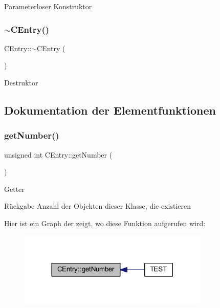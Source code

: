 Parameterloser Konstruktor \mbox{\label{class_c_entry_adb596f3be932c1db3d6072a9d6d26f5e}} 
\subsubsection{\texorpdfstring{$\sim$\+C\+Entry()}{~CEntry()}}
{\footnotesize\ttfamily C\+Entry\+::$\sim$\+C\+Entry (\begin{DoxyParamCaption}{ }\end{DoxyParamCaption})\hspace{0.3cm}{\ttfamily [virtual]}}

Destruktor 

\subsection{Dokumentation der Elementfunktionen}
\mbox{\label{class_c_entry_a6e8cde8d4a78cc65fceeb5f0430a2b55}} 
\subsubsection{\texorpdfstring{get\+Number()}{getNumber()}}
{\footnotesize\ttfamily unsigned int C\+Entry\+::get\+Number (\begin{DoxyParamCaption}{ }\end{DoxyParamCaption})\hspace{0.3cm}{\ttfamily [static]}}

Getter \begin{DoxyReturn}{Rückgabe}
Anzahl der Objekten dieser Klasse, die existieren 
\end{DoxyReturn}
Hier ist ein Graph der zeigt, wo diese Funktion aufgerufen wird\+:
\nopagebreak
\begin{figure}[H]
\begin{center}
\leavevmode
\includegraphics[width=257pt]{class_c_entry_a6e8cde8d4a78cc65fceeb5f0430a2b55_icgraph}
\end{center}
\end{figure}
\mbox{\label{class_c_entry_aede4d6e03efa3abb0ed56349edb5b86d}} 
